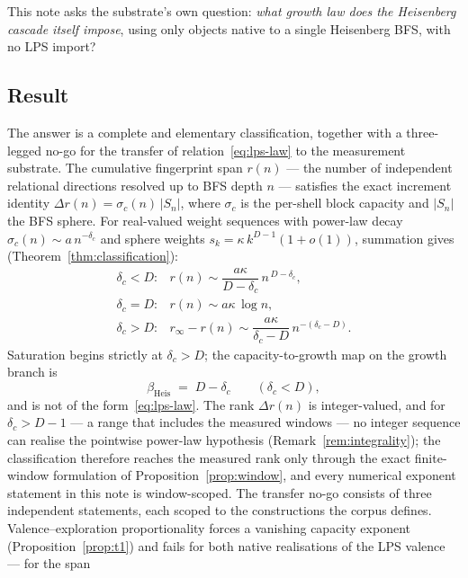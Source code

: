 \documentclass[11pt,a4paper]{article}
\theoremstyle{definition}
\newcommand{\dc}{\delta_c}
\begin{document}
This note asks the substrate's own question: \emph{what growth law does the Heisenberg cascade itself
impose}, using only objects native to a single Heisenberg BFS, with no LPS import?

\subsection{Result}
\label{ssec:result}

The answer is a complete and elementary classification, together with a three-legged no-go for the transfer
of relation~\eqref{eq:lps-law} to the measurement substrate.
The cumulative fingerprint span $r(n)$ --- the number of independent relational directions resolved up to
BFS depth $n$ --- satisfies the exact increment identity $\Delta r(n) = \sigma_c(n)\,|S_n|$, where
$\sigma_c$ is the per-shell block capacity and $|S_n|$ the BFS sphere.
For real-valued weight sequences with power-law decay $\sigma_c(n) \sim a\,n^{-\dc}$ and sphere weights
$s_k = \kappa\,k^{D-1}(1 + o(1))$, summation gives (Theorem~\ref{thm:classification}):
\begin{equation}
  \label{eq:branches}
  \begin{array}{ll}
    \dc < D: & r(n) \sim \dfrac{a\kappa}{D-\dc}\, n^{\,D-\dc},\\[3mm]
    \dc = D: & r(n) \sim a\kappa\, \log n,\\[2mm]
    \dc > D: & r_\infty - r(n) \sim \dfrac{a\kappa}{\dc-D}\, n^{-(\dc-D)}.
  \end{array}
\end{equation}
Saturation begins strictly at $\dc > D$; the capacity-to-growth map on the growth branch is
\begin{equation}
  \label{eq:heis-law}
  \beta_{\mathrm{Heis}} \;=\; D - \dc \qquad (\dc < D),
\end{equation}
and is not of the form~\eqref{eq:lps-law}.
The rank $\Delta r(n)$ is integer-valued, and for $\dc > D - 1$ --- a range that includes the measured
windows --- no integer sequence can realise the pointwise power-law hypothesis
(Remark~\ref{rem:integrality}); the classification therefore reaches the measured rank only through the
exact finite-window formulation of Proposition~\ref{prop:window}, and every numerical exponent statement in
this note is window-scoped.
The transfer no-go consists of three independent statements, each scoped to the constructions the corpus
defines.
Valence--exploration proportionality forces a vanishing capacity exponent
(Proposition~\ref{prop:t1}) and fails for both native realisations of the LPS valence --- for the span
\end{document}
